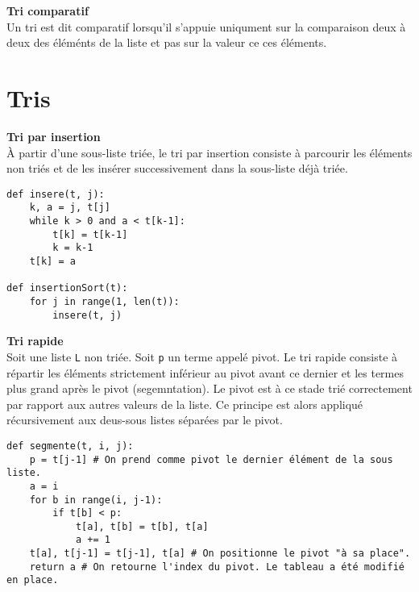 \begin{defi}\textbf{Tri comparatif} \\
Un tri est dit comparatif lorsqu'il s'appuie uniqument sur la comparaison deux à deux des éléménts de la liste et pas sur la valeur ce ces éléments.
\end{defi}


\section{Tris}

\begin{defi}\textbf{Tri par insertion} \\

À partir d'une sous-liste triée, le tri par insertion consiste à parcourir les éléments non triés et de les insérer successivement dans la sous-liste déjà triée. 
\end{defi}

\begin{lstlisting}
def insere(t, j):
    k, a = j, t[j]
    while k > 0 and a < t[k-1]:
        t[k] = t[k-1]
        k = k-1
    t[k] = a
    
def insertionSort(t):
    for j in range(1, len(t)):
        insere(t, j)
\end{lstlisting}


\begin{defi}\textbf{Tri rapide} \\

Soit une liste \texttt{L} non triée. Soit \texttt{p} un terme appelé pivot. Le tri rapide consiste à répartir les éléments strictement inférieur au pivot avant ce dernier et les termes plus grand après le pivot (segemntation). Le pivot est à ce stade trié correctement par rapport aux autres valeurs de la liste. Ce principe est alors appliqué récursivement aux deus-sous listes  séparées par le pivot.

\end{defi}


\begin{lstlisting}
def segmente(t, i, j):
    p = t[j-1] # On prend comme pivot le dernier élément de la sous liste. 
    a = i
    for b in range(i, j-1):
        if t[b] < p:
            t[a], t[b] = t[b], t[a]
            a += 1
    t[a], t[j-1] = t[j-1], t[a] # On positionne le pivot "à sa place".
    return a # On retourne l'index du pivot. Le tableau a été modifié en place. 
\end{lstlisting}

